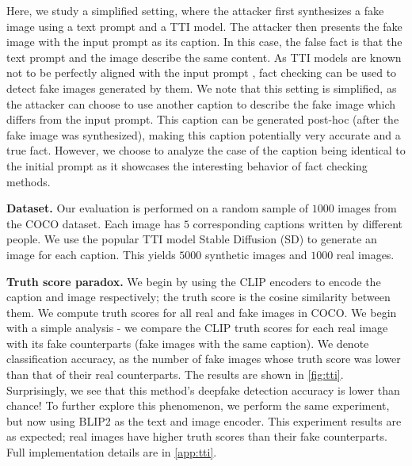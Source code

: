 \documentclass{article} \usepackage{iclr2024_conference,times}
\begin{document}
Here, we study a simplified setting, where the attacker first synthesizes a fake image using a text prompt and a TTI model. The attacker then presents the fake image with the input prompt as its caption. In this case, the false fact is that the text prompt and the image describe the same content. As TTI models are known not to be perfectly aligned with the input prompt \citep{imagereward,attend_and_excite}, fact checking can be used to detect fake images generated by them. We note that this setting is simplified, as the attacker can choose to use another caption to describe the fake image which differs from the input prompt. This caption can be generated post-hoc (after the fake image was synthesized), making this caption potentially very accurate and a true fact. However, we choose to analyze the case of the caption being identical to the initial prompt as it showcases the interesting behavior of fact checking methods.   

\textbf{Dataset.} Our evaluation is performed on a random sample of $1000$ images from the COCO \citep{coco} dataset. Each image has $5$ corresponding captions written by different people. We use the popular TTI model Stable Diffusion (SD) to generate an image for each caption. This yields $5000$ synthetic images and $1000$ real images.   

\textbf{Truth score paradox.} We begin by using the CLIP \citep{clip} encoders to encode the caption and image respectively; the truth score is the cosine similarity between them. We compute truth scores for all real and fake images in COCO. We begin with a simple analysis - we compare the CLIP truth scores for each real image with its fake counterparts (fake images with the same caption). We denote classification accuracy, as the number of fake images whose truth score was lower than that of their real counterparts. The results are shown in \cref{fig:tti}. Surprisingly, we see that this method's deepfake detection accuracy is lower than chance! To further explore this phenomenon, we perform the same experiment, but now using BLIP2 \citep{blip2} as the text and image encoder. This experiment results are as expected; real images have higher truth scores than their fake counterparts. Full implementation details are in \cref{app:tti}.
\end{document}
